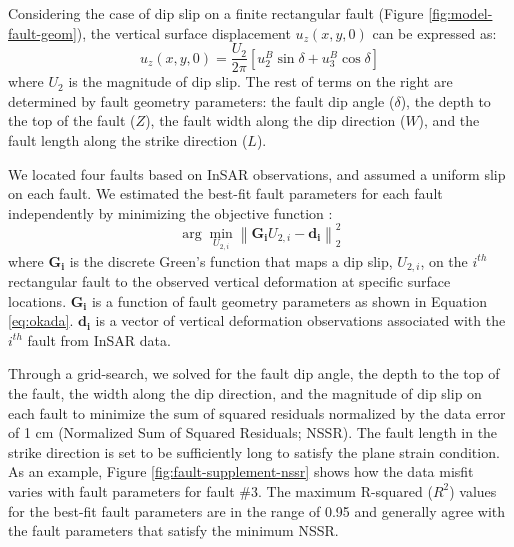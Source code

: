 \documentclass[draft,grl]{agutexSI2019}
\begin{document}
\begin{article}
Considering the case of dip slip on a finite rectangular fault (Figure \ref{fig:model-fault-geom}), the vertical surface displacement $u_z(x, y, 0)$ can be expressed as:
\begin{equation}
    u_{z}(x,y,0)=\frac{U_{2}}{2\pi }[u_{2}^{B}\sin \delta + u_{3}^{B}\cos \delta]
\label{eq:okada}
\end{equation}
where $U_2$ is the magnitude of dip slip. The rest of terms on the right are determined by fault geometry parameters: the fault dip angle ($\delta$), the depth to the top of the fault ($Z$), the fault width along the dip direction ($W$), and the fault length along the strike direction ($L$). 

We located four faults based on InSAR observations, and assumed a uniform slip on each fault. We estimated the best-fit fault parameters for each fault independently by minimizing the objective function \cite{Du1992}:
\begin{equation}
\arg \min_{U_{2,i}} \left \| \mathbf{G_i}U_{2,i}-\mathbf{d_i} \right \|^2_{2}  
\label{eq:model-obj-1}
\end{equation}	  	
where $\mathbf{G_i}$ is the discrete Green’s function that maps a dip slip, $U_{2,i}$, on the $i^{th}$ rectangular fault to the observed vertical deformation at specific surface locations.  $\mathbf{G_i}$ is a function of fault geometry parameters as shown in Equation \eqref{eq:okada}. $\mathbf{d_i}$ is a vector of vertical deformation observations associated with the $i^{th}$ fault from InSAR data.

Through a grid-search, we solved for the fault dip angle, the depth to the top of the fault, the width along the dip direction, and the magnitude of dip slip on each fault to minimize the sum of squared residuals normalized by the data error of 1 cm (Normalized Sum of Squared Residuals; NSSR). The fault length in the strike direction is set to be sufficiently long to satisfy the plane strain condition. As an example, Figure \ref{fig:fault-supplement-nssr} shows how the data misfit varies with fault parameters for fault \#3. The maximum R-squared ($R^2$) values for the best-fit fault parameters are in the range of 0.95 and generally agree with the fault parameters that satisfy the minimum NSSR. 


\end{article}
\end{document}
